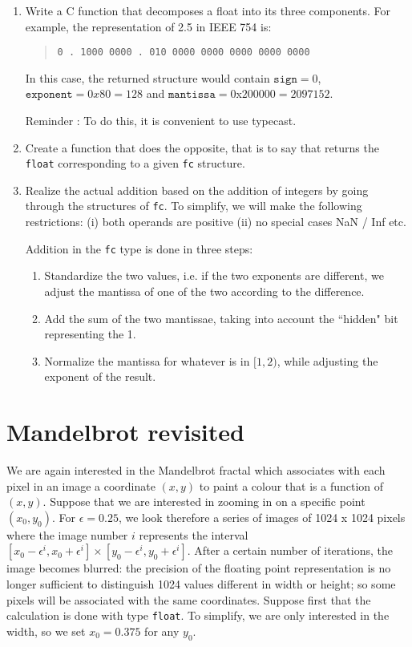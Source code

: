 \documentclass[11pt]{article}
\begin{document}
\begin{enumerate}
\item Write a C function that decomposes a float into its three components. For example, the representation of  2.5 in IEEE 754 is:
\begin{quote}
\verb+0 . 1000 0000 . 010 0000 0000 0000 0000 0000+
\end{quote}
In this case, the returned structure would contain $\mathtt{sign}=0$, $\mathtt{exponent}=0x80=128$ and $\mathtt{mantissa}=0$x$200000=2097152$.

Reminder : To do this, it is convenient to use typecast. 


\item Create a function that does the opposite, that is to say that returns the \texttt{float} corresponding to a given \verb+fc+ structure.


\item Realize the actual addition based on the addition of integers by going through the structures of \verb+fc+. To simplify, we will make the following restrictions: (i) both operands are positive
  (ii) no special cases NaN / Inf etc.

Addition in the \verb+fc+ type is done in three steps:
\begin{enumerate}
\item Standardize the two values, i.e. if the two exponents are
different, we adjust the mantissa of one of the two according to the
difference.
\item Add the sum of the two mantissae, taking into account the  ``hidden" bit
representing the 1.
\item Normalize the mantissa for whatever is in $[1,2)$, while adjusting
the exponent of the result.
\end{enumerate}

\end{enumerate}

\section{Mandelbrot revisited}
We are again interested in the Mandelbrot fractal which associates with each pixel in an image
a coordinate $(x, y)$ to paint a colour that is a function of $(x, y)$. Suppose
that we are interested in zooming in on a specific point $(x_0, y_0)$. For $\epsilon = 0.25$, we look
therefore a series of images of 1024 x 1024 pixels where the image number $i$ represents the interval
$[x_0-\epsilon^i, x_0 + \epsilon^i] \times [y_0-\epsilon^i, y_0+\epsilon^i]$. After a certain number of iterations, the image becomes blurred: the precision of the floating point representation is no longer sufficient to distinguish 1024 values
different in width or height; so some pixels will be associated with the same
coordinates. Suppose first that the calculation is done with type \texttt{float}. To simplify, we
are only interested in the width, so we set $x_0 = 0.375$ for any $y_0$.
\end{document}
